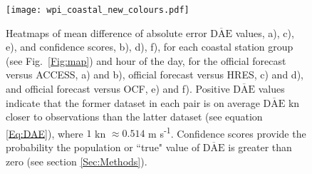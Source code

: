 \documentclass[twocol]{ametsoc}
\begin{document}
\begin{figure}
\centering
\texttt{[image: wpi\_coastal\_new\_colours.pdf]}
\caption{Heatmaps of mean difference of absolute error $\overline{\text{DAE}}$ values, a), c), e), and confidence scores, b), d), f), for each coastal station group (see Fig.~\ref{Fig:map}) and hour of the day, for the official forecast versus ACCESS, a) and b), official forecast versus HRES, c) and d), and official forecast versus OCF, e) and f). Positive $\overline{\text{DAE}}$ values indicate that the former dataset in each pair is on average $\overline{\text{DAE}}$ kn closer to observations than the latter dataset (see equation \ref{Eq:DAE}), where $1$ kn $\approx 0.514$ m s\textsuperscript{-1}. Confidence scores provide the probability the population or ``true" value of $\overline{\text{DAE}}$ is greater than zero (see section \ref{Sec:Methods}).}
\label{Fig:wpi_coastal}
\end{figure}
\end{document}
